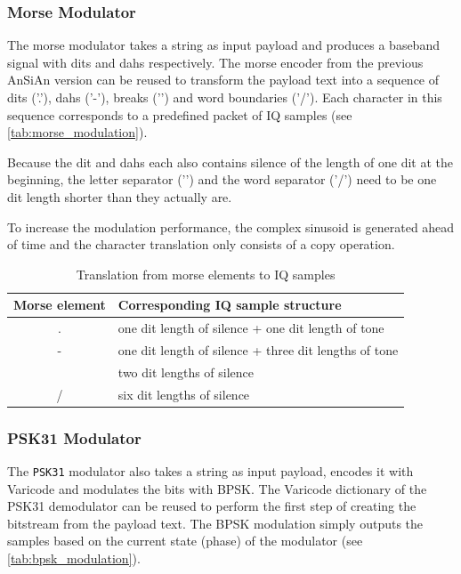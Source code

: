 \subsubsection{Morse Modulator}

The morse modulator takes a string as input payload and produces a baseband
signal with dits and dahs respectively. The morse encoder from the previous
\ac{AnSiAn} version can be reused to transform the payload text into a
sequence of dits ('.'), dahs ('-'), breaks ('\textvisiblespace') and word
boundaries ('/'). Each character in this sequence corresponds to a predefined
packet of IQ samples (see \autoref{tab:morse_modulation}).

Because the dit and dahs each also contains silence of the length of one dit at
the beginning, the letter separator ('\textvisiblespace') and the word separator
('/') need to be one dit length shorter than they actually are.

To increase the modulation performance, the complex sinusoid is generated
ahead of time and the character translation only consists of a copy operation.

\begin{table}
	\begin{center}
		\begin{tabular}{c l}
			Morse element & Corresponding IQ sample structure \\\hline
			. & one dit length of silence + one dit length of tone \\
			- & one dit length of silence + three dit lengths of tone \\
			\textvisiblespace & two dit lengths of silence \\
			/ & six dit lengths of silence \\\hline
		\end{tabular}
		\caption{Translation from morse elements to IQ samples}
		\label{tab:morse_modulation}
	\end{center}
\end{table}


\subsubsection{PSK31 Modulator}

The \texttt{PSK31} modulator also takes a string as input payload, encodes it with
Varicode and modulates the bits with \ac{BPSK}. The Varicode dictionary of
the PSK31 demodulator can be reused to perform the first step of creating
the bitstream from the payload text. The \ac{BPSK} modulation simply outputs
the samples based on the current state (phase) of the modulator (see
\autoref{tab:bpsk_modulation}).

